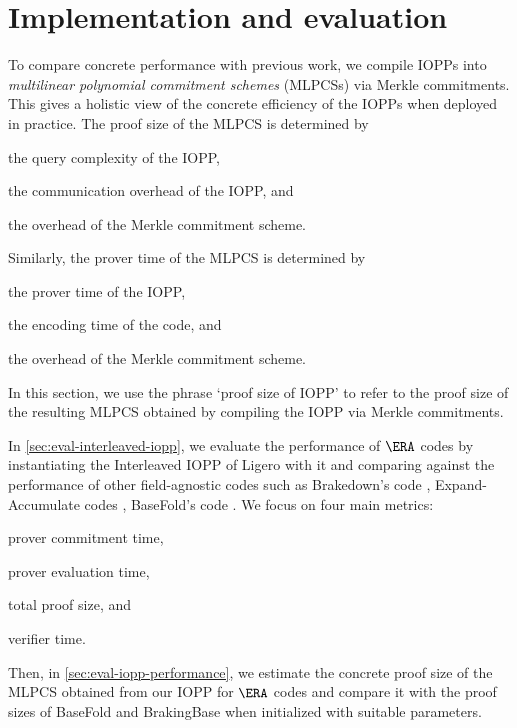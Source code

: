 \doclearpage
\section{Implementation and evaluation}
\label{sec:evaluation}

To compare concrete performance with previous work, we compile IOPPs into \emph{multilinear polynomial commitment schemes} (MLPCSs) via Merkle commitments.
This gives a holistic view of the concrete efficiency of the IOPPs when deployed in practice.
The proof size of the MLPCS is determined by 
\begin{enumerate*}[label=(\alph*)]
    \item the query complexity of the IOPP,
    \item the communication overhead of the IOPP, and
    \item the overhead of the Merkle commitment scheme.
\end{enumerate*}
Similarly, the prover time of the MLPCS is determined by
\begin{enumerate*}[label=(\alph*)]
    \item the prover time of the IOPP,
    \item the encoding time of the code, and
    \item the overhead of the Merkle commitment scheme.
\end{enumerate*}
In this section, we use the phrase `proof size of IOPP' to refer to the proof size of the resulting MLPCS obtained by compiling the IOPP via Merkle commitments.

In \cref{sec:eval-interleaved-iopp}, we evaluate the performance of $\ERA$ codes by instantiating the Interleaved IOPP of Ligero \cite{AmesHIV17} with it and comparing against the performance of other field-agnostic codes such as Brakedown's code \cite{GolovnevLSTW23}, Expand-Accumulate codes \cite{BlockFKTWZ24}, BaseFold's code \cite{ZeilbergerCF24}.
We focus on four main metrics: \begin{enumerate*}[label=(\alph*)]
    \item prover commitment time, \item prover evaluation time, \item total proof size, and \item verifier time.
\end{enumerate*}
Then, in \cref{sec:eval-iopp-performance}, we estimate the concrete proof size of the MLPCS obtained from our IOPP for $\ERA$ codes and compare it with the proof sizes of BaseFold \cite{ZeilbergerCF24} and BrakingBase \cite{NairST25} when initialized with suitable parameters.

